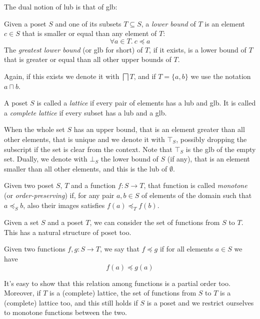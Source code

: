 The dual notion of lub is that of glb:
\begin{definition}
	Given a poset $S$ and one of its subsets $T \subseteq S$, a \textit{lower bound} of $T$ is an element $c \in S$ that is smaller or equal than any element of $T$:
	\[
	\forall a \in T.\ c \preceq a
	\]
	The \textit{greatest lower bound} (or glb for short) of $T$, if it exists, is a lower bound of $T$ that is greater or equal than all other upper bounds of $T$.
\end{definition}
Again, if this exists we denote it with $\bigsqcap T$, and if $T = \{ a, b \}$ we use the notation $a \sqcap b$.

\begin{definition}[Lattice]
	A poset $S$ is called a \textit{lattice} if every pair of elements has a lub and glb. It is called a \textit{complete lattice} if every subset has a lub and a glb.
\end{definition}

When the whole set $S$ has an upper bound, that is an element greater than all other elements, that is unique and we denote it with $\top_S$, possibly dropping the subscript if the set is clear from the context. Note that $\top_S$ is the glb of the empty set. Dually, we denote with $\bot_S$ the lower bound of $S$ (if any), that is an element smaller than all other elements, and this is the lub of $\emptyset$.

\begin{definition}
	Given two poset $S$, $T$ and a function $f : S \rightarrow T$, that function is called \textit{monotone} (or \textit{order-preserving}) if, for any pair $a, b \in S$ of elements of the domain such that $a \preceq_S b$, also their images satisfies $f(a) \preceq_T f(b)$.
\end{definition}

Given a set $S$ and a poset $T$, we can consider the set of functions from $S$ to $T$. This has a natural structure of poset too.
\begin{definition}
	Given two functions $f, g: S \rightarrow T$, we say that $f \preceq g$ if for all elements $a \in S$ we have
	\[
	f(a) \preceq g(a)
	\]
\end{definition}
It's easy to show that this relation among functions is a partial order too. Moreover, if $T$ is a (complete) lattice, the set of functions from $S$ to $T$ is a (complete) lattice too, and this still holds if $S$ is a poset and we restrict ourselves to monotone functions between the two.

